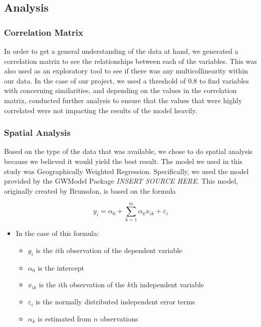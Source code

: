 \documentclass[
]{article}
\providecommand{\tightlist}{%
  \setlength{\itemsep}{0pt}\setlength{\parskip}{0pt}}\usepackage{longtable,booktabs,array}
\begin{document}
\subsection{Analysis}\label{analysis}

\subsubsection{Correlation Matrix}\label{correlation-matrix}

In order to get a general understanding of the data at hand, we
generated a correlation matrix to see the relationships between each of
the variables. This was also used as an exploratory tool to see if there
was any multicollinearity within our data. In the case of our project,
we used a threshold of 0.8 to find variables with concerning
similarities, and depending on the values in the correlation matrix,
conducted further analysis to ensure that the values that were highly
correlated were not impacting the results of the model heavily.

\subsubsection{Spatial Analysis}\label{spatial-analysis}

Based on the type of the data that was available, we chose to do spatial
analysis because we believed it would yield the best result. The model
we used in this study was Geographically Weighted Regression.
Specifically, we used the model provided by the GWModel Package
\emph{INSERT SOURCE HERE}. This model, originally created by Brunsdon,
is based on the formula

\[y_i = \alpha_{0} + \sum_{k=1}^{m} \alpha_{k}x_{ik} + \varepsilon_{i}\]

\begin{itemize}
\tightlist
\item
  In the case of this formula:

  \begin{itemize}
  \tightlist
  \item
    \(y_i\) is the \(i\)th observation of the dependent variable
  \item
    \(\alpha_0\) is the intercept
  \item
    \(x_{ik}\) is the \(i\)th observation of the \(k\)th independent
    variable
  \item
    \(\varepsilon_{i}\) is the normally distributed independent error
    terms
  \item
    \(\alpha_{k}\) is estimated from \(n\) observations
  \end{itemize}
\end{itemize}
\end{document}
